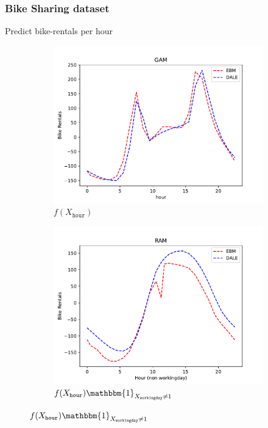 \documentclass{beamer}
\newcommand{\when}[1]{\mathbbm{1}_{#1}}
\begin{document}
\begin{frame}
  \frametitle{Bike Sharing dataset}
  Predict bike-rentals per hour
  \noindent\makebox[\linewidth]{\rule{\paperwidth}{0.4pt}}
\begin{figure}[htbp]
    \centering
    \begin{subfigure}{0.32\textwidth}
        \centering
        \includegraphics[width=\textwidth]{figures/bike_rentals_gam}
        \caption{\(f(X_{\mathtt{hour}})\)}
        \label{subfig:bike_rentals_gam}
    \end{subfigure}
    \begin{subfigure}{0.32\textwidth}
        \centering
        \includegraphics[width=\textwidth]{figures/bike_rentals_ram_1}
        \caption{\(f(X_{\mathtt{hour}}) \when{X_{\mathtt{workingday}} \neq 1}\)}

\end{subfigure}
\end{figure}
\end{frame}
\end{document}
